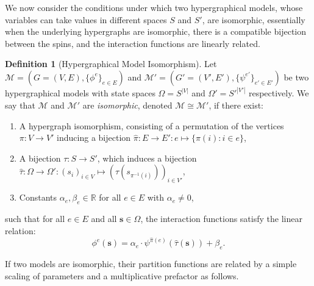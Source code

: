 \documentclass[11pt,reqno]{amsart}
\newcommand{\vecs}{\boldsymbol{s}}
\newcommand{\Mo}{\mathcal{M}}
\newcommand{\statespace}{\Omega}
\theoremstyle{plain}
\theoremstyle{definition}
\newtheorem{definition}[theorem]{Definition}
\numberwithin{equation}{section}
\begin{document}
We now consider the conditions under which two hypergraphical models, whose variables can take values in different spaces $S$ and $S'$, are isomorphic, essentially when the underlying hypergraphs are isomorphic, there is a compatible bijection between the spins, and the interaction functions are linearly related.

\begin{definition}[Hypergraphical Model Isomorphism]
Let $\Mo = (G = (V,E), \{\phi^e\}_{e \in E})$ and $\Mo' = (G' = (V',E'), \{\psi^{e'}\}_{e' \in E'})$ be two hypergraphical models with state spaces $\statespace = S^{|V|}$ and $\statespace' = S'^{|V'|}$ respectively. We say that $\Mo$ and $\Mo'$ are \emph{isomorphic}, denoted $\Mo \cong \Mo'$, if there exist:
\begin{enumerate}
    \item A hypergraph isomorphism, consisting of a permutation of the vertices $\pi: V \to V'$ inducing a bijection $\hat{\pi}: E \to E' \colon e \mapsto \{ \pi (i) \colon i \in e \}$,
    \item A bijection $\tau: S \to S'$, which induces a bijection $\hat{\tau} \colon \statespace \to \statespace' \colon (s_i)_{i\in V} \mapsto (\tau(s_{\pi^{-1}(i)}))_{i \in V'}$, 
    \item Constants $\alpha_e, \beta_e \in \mathbb{R}$ for all $e \in E$ with $\alpha_e \neq 0$,
\end{enumerate}
such that for all $e \in E$ and all $\vecs \in \statespace$, the interaction functions satisfy the linear relation:
\begin{equation}
    \phi^e(\vecs) = \alpha_e \cdot \psi^{\hat{\pi}(e)}(\hat{\tau}(\vecs)) + \beta_e.
\end{equation}
\end{definition}

If two models are isomorphic, their partition functions are related by a simple scaling of parameters and a multiplicative prefactor as follows.
\end{document}
